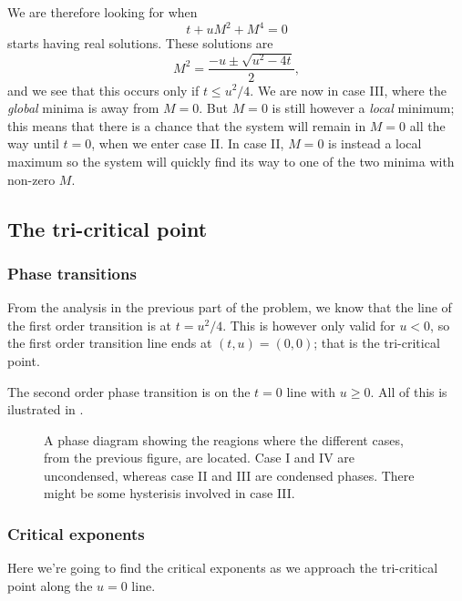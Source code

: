 \documentclass[11pt,letter, swedish, english
]{article}
\newcommand{\Tc}{\ensuremath{T_{\text{c}}}}
\begin{document}
We are therefore looking for when
\begin{equation}
t+uM^2+M^4=0
\end{equation}
starts having real solutions. These solutions are
\begin{equation}
M^2=\frac{-u\pm\sqrt{u^2-4t}}{2},
\end{equation}
and we see that this occurs only if $t\le u^2/4$. We are now in case
III, where the \emph{global} minima is away from $M=0$. But $M=0$ is
still however a \emph{local} minimum; this means that there is a
chance that the system will remain in $M=0$ all the way until $t=0$,
when we enter case II. In case II, $M=0$ is instead a local maximum so the
system will quickly find its way to one of the two minima with
non-zero $M$. 



\subsection{The tri-critical point}

\subsubsection{Phase transitions}
From the analysis in the previous part of the problem, we know that
the line of the first order transition is at $t=u^2/4$. This is
however only valid for $u<0$, so the first order transition line ends
at $(t, u)=(0, 0)$; that is the tri-critical point.

The second order phase transition is on the $t=0$ line with
$u\ge0$. All of this is ilustrated in .

\begin{figure}\centering

\caption{A phase diagram showing the reagions where the different
  cases, from the previous figure, are located. Case I and IV are 
  uncondensed, whereas case II and III are condensed phases. There
  might be some hysterisis involved in case III. }
\label{fig:2_phase}
\end{figure}

\subsubsection{Critical exponents}
Here we're going to find the critical exponents as we approach the
tri-critical point along the $u=0$ line. 
\end{document}
